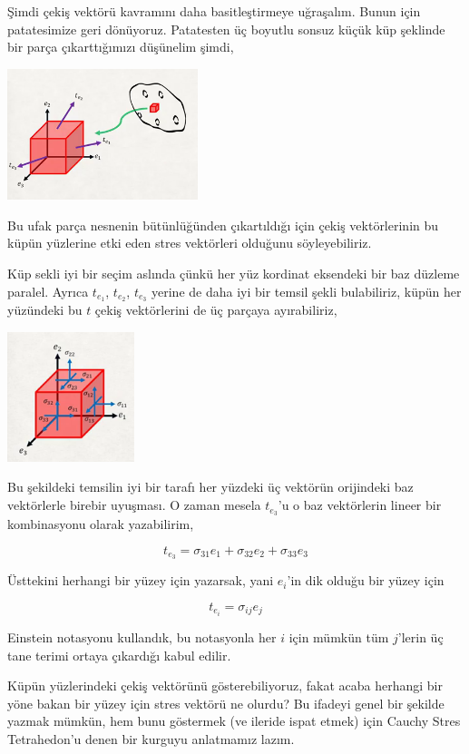 \documentclass[12pt,fleqn]{article}\usepackage{../../common}
\begin{document}
Şimdi çekiş vektörü kavramını daha basitleştirmeye uğraşalım. Bunun için
patatesimize geri dönüyoruz. Patatesten üç boyutlu sonsuz küçük küp şeklinde bir
parça çıkarttığımızı düşünelim şimdi,

\includegraphics[width=15em]{phy_020_strs_02_03.png}

Bu ufak parça nesnenin bütünlüğünden çıkartıldığı için çekiş vektörlerinin
bu küpün yüzlerine etki eden stres vektörleri olduğunu söyleyebiliriz.

Küp sekli iyi bir seçim aslında çünkü her yüz kordinat eksendeki bir baz düzleme
paralel. Ayrıca $t_{e_1}$, $t_{e_2}$, $t_{e_3}$ yerine de daha iyi bir temsil
şekli bulabiliriz, küpün her yüzündeki bu $t$ çekiş vektörlerini de üç parçaya
ayırabiliriz,

\includegraphics[width=10em]{phy_020_strs_02_04.png}

Bu şekildeki temsilin iyi bir tarafı her yüzdeki üç vektörün orijindeki
baz vektörlerle birebir uyuşması. O zaman mesela $t_{e_3}$'u o baz vektörlerin
lineer bir kombinasyonu olarak yazabilirim,

$$
t_{e_3} = \sigma_{31} e_1 + \sigma_{32} e_2 + \sigma_{33} e_3
$$

Üsttekini herhangi bir yüzey için yazarsak, yani $e_i$'in dik olduğu bir yüzey
için

$$
t_{e_i} = \sigma_{ij} e_j
$$

Einstein notasyonu kullandık, bu notasyonla her $i$ için mümkün tüm $j$'lerin üç
tane terimi ortaya çıkardığı kabul edilir.

Küpün yüzlerindeki çekiş vektörünü gösterebiliyoruz, fakat acaba herhangi bir
yöne bakan bir yüzey için stres vektörü ne olurdu? Bu ifadeyi genel bir şekilde
yazmak mümkün, hem bunu göstermek (ve ileride ispat etmek) için Cauchy Stres
Tetrahedon'u denen bir kurguyu anlatmamız lazım.
\end{document}
